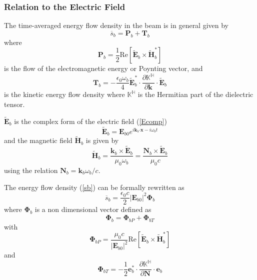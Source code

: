 \subsubsection{Relation to the Electric Field}

The time-averaged energy flow density in the beam is in general given by
\begin{equation}
\overline{s}_{b}=\mathbf{P}_{b}+\mathbf{T}_{b} \label{sb}%
\end{equation}
where
\begin{equation}
\mathbf{P}_{b}=\frac{1}{2}\text{Re}\left[  \widetilde{\mathbf{E}}_{b}%
\times\widetilde{\mathbf{H}}_{b}^{*}\right]
\end{equation}
is the flow of the electromagnetic energy or Poynting vector, and
\begin{equation}
\mathbf{T}_{b}=-\frac{\epsilon_{0}\omega_{b}}{4}\widetilde{\mathbf{E}}_{b}%
^{*}\cdot\frac{\partial\mathbb{{K}^{H}}}{\partial\mathbf{k}}\cdot
\widetilde{\mathbf{E}}_{b}%
\end{equation}
is the kinetic energy flow density where $\mathbb{{K}^{H}}$ is the Hermitian
part of the dielectric tensor.

$\widetilde{\mathbf{E}}_{b}$ is the complex form of the electric field
(\ref{Ecomp})
\begin{equation}
\widetilde{\mathbf{E}}_{b}=\mathbf{E}_{b0}e^{i\mathbf{k}_{b}\mathbf{\cdot
x}-i\omega_{b}t}%
\end{equation}
and the magnetic field $\widetilde{\mathbf{H}}_{b}$ is given by
\begin{equation}
\widetilde{\mathbf{H}}_{b}=\frac{\mathbf{k}_{b}\times\widetilde{\mathbf{E}%
}_{b}}{\mu_{0}\omega_{b}}=\frac{\mathbf{N}_{b}\times\widetilde{\mathbf{E}}%
_{b}}{\mu_{0}c} \label{Hfield}%
\end{equation}
using the relation $\mathbf{N}_{b}=\mathbf{k}_{b}\omega_{b}/c.$

The energy flow density (\ref{sb}) can be formally rewritten as
\begin{equation}
\overline{s}_{b}=\frac{\epsilon_{0}c}{2}\left|  \mathbf{E}_{b0}\right|
^{2}\mathbf{\Phi}_{b}%
\end{equation}
where $\mathbf{\Phi}_{b}$ is a non dimensional vector defined as
\begin{equation}
\mathbf{\Phi}_{b}=\mathbf{\Phi}_{bP}+\mathbf{\Phi}_{bT} \label{phib2}%
\end{equation}
with
\begin{equation}
\mathbf{\Phi}_{bP}=\frac{\mu_{0}c}{\left|  \mathbf{E}_{b0}\right|  ^{2}%
}\text{Re}\left[  \widetilde{\mathbf{E}}_{b}\times\widetilde{\mathbf{H}}%
_{b}^{\ast}\right]  \label{phib}%
\end{equation}
and
\begin{equation}
\mathbf{\Phi}_{bT}=\mathbf{-}\frac{1}{2}\mathbf{e}_{b}^{\ast}\cdot
\frac{\partial\mathbb{{K}^{H}}}{\partial\mathbf{N}}\cdot\mathbf{e}_{b}
\label{phit}%
\end{equation}

